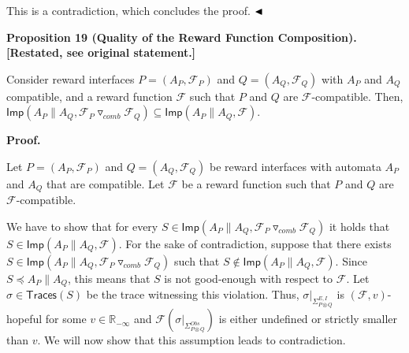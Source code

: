 This is a contradiction, which concludes the proof. $\hfill\blacktriangleleft$\par
 
 
 
 
\par\medskip\noindent\textbf{Proposition 19 (Quality of the Reward Function Composition). [Restated, see original statement.]}\par
 
 
Consider reward interfaces $P=(A_{P},\mathcal{F}_{P})$ and $Q=(A_{Q},\mathcal{F}_{Q})$ with $A_{P}$ and $A_{Q}$ compatible, and a reward function $\mathcal{F}$ such that $P$ and $Q$ are $\mathcal{F}$-compatible. Then, $\mathsf{Imp}(A_{P}\parallel A_{Q},{{\mathcal{F}_{P}}\mathbin{\triangledown_{\mathit{comb}}}{\mathcal{F}_{Q}}})\subseteq\mathsf{Imp}(A_{P}\parallel A_{Q},\mathcal{F})$.\par
 
 
 
 
 
 
\par\medskip\noindent\textbf{Proof.}\par
 
 
Let $P=(A_{P},\mathcal{F}_{P})$ and $Q=(A_{Q},\mathcal{F}_{Q})$ be reward interfaces with automata $A_{P}$ and $A_{Q}$ that are compatible. Let $\mathcal{F}$ be a reward function such that $P$ and $Q$ are $\mathcal{F}$-compatible.\par
 
 
 
We have to show that for every $S\in\mathsf{Imp}(A_{P}\parallel A_{Q},{{\mathcal{F}_{P}}\mathbin{\triangledown_{\mathit{comb}}}{\mathcal{F}_{Q}}})$ it holds that $S\in\mathsf{Imp}(A_{P}\parallel A_{Q},\mathcal{F})$. For the sake of contradiction, suppose that there exists $S\in\mathsf{Imp}(A_{P}\parallel A_{Q},{{\mathcal{F}_{P}}\mathbin{\triangledown_{\mathit{comb}}}{\mathcal{F}_{Q}}})$ such that $S\not\in\mathsf{Imp}(A_{P}\parallel A_{Q},\mathcal{F})$. Since $S\preceq A_{P}\parallel A_{Q}$, this means that $S$ is not good-enough with respect to $\mathcal{F}$. Let $\sigma\in\mathsf{Traces}(S)$ be the trace witnessing this violation. Thus, $\sigma|_{\Sigma_{P\otimes Q}^{E,I}}$ is $(\mathcal{F},v)$-hopeful for some $v\in\mathbb{R}_{-\infty}$ and $\mathcal{F}(\sigma|_{\Sigma_{P\otimes Q}^{Obs}})$ is either undefined or strictly smaller than $v$. We will now show that this assumption leads to contradiction.\par
 
